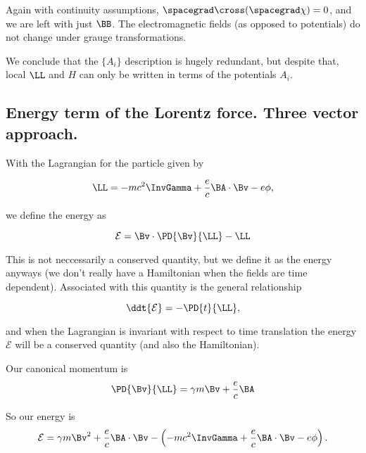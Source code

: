 Again with continuity assumptions, $\spacegrad \cross (\spacegrad \chi) = 0$, and we are left with just $\BB$.  The electromagnetic fields (as opposed to potentials) do not change under grauge transformations.

We conclude that the $\{A_i\}$ description is hugely redundant, but despite that, local $\LL$ and $H$ can only be written in terms of the potentials $A_i$.

\subsection{Energy term of the Lorentz force.  Three vector approach.}

With the Lagrangian for the particle given by

\begin{equation}\label{eqn:relativisticElectrodynamicsL10:n}
\LL = - mc^2 \InvGamma + \frac{e}{c} \BA \cdot \Bv - e \phi,
\end{equation}

we define the energy as 

\begin{equation}\label{eqn:relativisticElectrodynamicsL10:n}
\mathcal{E} = \Bv \cdot \PD{\Bv}{\LL} - \LL
\end{equation}

This is not neccessarily a conserved quantity, but we define it as the energy anyways (we don't really have a Hamiltonian when the fields are time dependent).  Associated with this quantity is the general relationship

\begin{equation}\label{eqn:relativisticElectrodynamicsL10:n}
\ddt{\mathcal{E}} = -\PD{t}{\LL},
\end{equation}

and when the Lagrangian is invariant with respect to time translation the energy $\mathcal{E}$ will be a conserved quantity (and also the Hamiltonian).

Our canonical momentum is 
\begin{equation}\label{eqn:relativisticElectrodynamicsL10:n}
\PD{\Bv}{\LL} = \gamma m \Bv + \frac{e}{c} \BA
\end{equation}

So our energy is
\begin{align*}
\mathcal{E} = \gamma m \Bv^2 + \frac{e}{c} \BA \cdot \Bv - \left( - mc^2 \InvGamma + \frac{e}{c} \BA \cdot \Bv - e \phi \right).
\end{align*}


